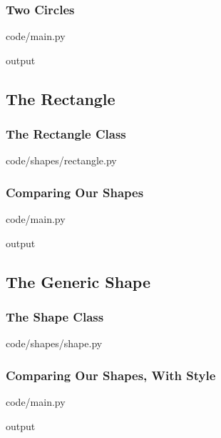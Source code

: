 \documentclass{beamer}
\newcommand{\closenewline}{%
  \par\nopagebreak
  \vspace{-\itemsep}
  \vspace{-\parsep}
}
\begin{document}
  \begin{frame}
    \frametitle{Two Circles}

    code/main.py
    

    output
    
  \end{frame}


\subsection{The Rectangle}
  \begin{frame}
    \frametitle{The Rectangle Class}
    code/shapes/rectangle.py
    
  \end{frame}

  \begin{frame}
    \frametitle{Comparing Our Shapes}

    code/main.py
    
    \closenewline
    

    output
    
    \closenewline
    
  \end{frame}

\subsection{The Generic Shape}
  \begin{frame}
    \frametitle{The Shape Class}
    code/shapes/shape.py
    
  \end{frame}

  \begin{frame}
    \frametitle{Comparing Our Shapes, With Style}

    code/main.py
    
    \closenewline
    
    \closenewline
    
    \closenewline
    

    output
    
    \closenewline
    
    \closenewline
    
  \end{frame}
\end{document}

